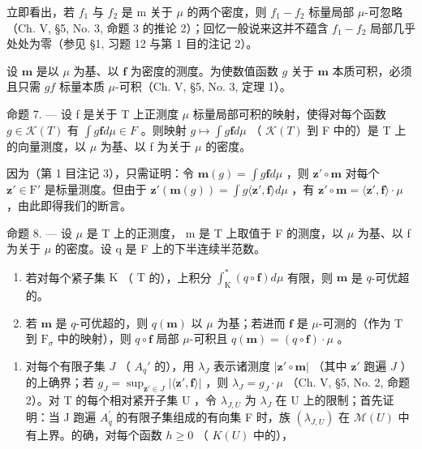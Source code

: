 立即看出，若 \(f_{1}\) 与 \(f_{2}\) 是 m 关于 \(\mu\) 的两个密度，则 \(f_{1}-f_{2}\) 标量局部 \(\mu\)-可忽略（Ch. V, §5, No. 3, 命题 3 的推论 2）；回忆一般说来这并不蕴含 \(f_{1}-f_{2}\) 局部几乎处处为零（参见 §1, 习题 12 与第 1 目的注记 2）。

设 \(\mathbf{m}\) 是以 \(\mu\) 为基、以 \(\mathbf{f}\) 为密度的测度。为使数值函数 \(g\) 关于 \(\mathbf{m}\) 本质可积，必须且只需 \(gf\) 标量本质 \(\mu\)-可积（Ch. V, §5, No. 3, 定理 1）。

命题 7. --- 设 f 是关于 T 上正测度 \(\mu\) 标量局部可积的映射，使得对每个函数 \(g \in \mathcal{K}(T)\) 有 \(\int g\mathbf{f} d\mu \in F\) 。则映射 \(g \mapsto \int g\mathbf{f} d\mu\) （ \(\mathcal{K}(T)\) 到 F 中的）是 T 上的向量测度，以 \(\mu\) 为基、以 f 为关于 \(\mu\) 的密度。

因为（第 1 目注记 3），只需证明：令 \(\mathbf{m}(g) = \int g\mathbf{f}d\mu\) ，则 \(\mathbf{z}' \circ \mathbf{m}\) 对每个 \(\mathbf{z}' \in \mathrm{F}'\) 是标量测度。但由于 \(\mathbf{z}'(\mathbf{m}(g)) = \int g\langle \mathbf{z}', \mathbf{f} \rangle d\mu\) ，有 \(\mathbf{z}' \circ \mathbf{m} = \langle \mathbf{z}', \mathbf{f} \rangle \cdot \mu\) ，由此即得我们的断言。

命题 8. --- 设 \(\mu\) 是 T 上的正测度， m 是 T 上取值于 F 的测度，以 \(\mu\) 为基、以 f 为关于 \(\mu\) 的密度。设 q 是 F 上的下半连续半范数。

\begin{enumerate}
\def\labelenumi{\alph{enumi})}
\item
  若对每个紧子集 \(\mathrm{K}\) （ \(\mathrm{T}\) 的），上积分 \(\int_{\mathrm{K}}^{*}(q \circ \mathbf{f}) d\mu\) 有限，则 \(\mathbf{m}\) 是 \(q\)-可优超的。
\item
  若 \(\mathbf{m}\) 是 \(q\)-可优超的，则 \(q(\mathbf{m})\) 以 \(\mu\) 为基；若进而 \(\mathbf{f}\) 是 \(\mu\)-可测的（作为 \(\mathrm{T}\) 到 \(\mathrm{F}_{\sigma}\) 中的映射），则 \(q \circ \mathbf{f}\) 局部 \(\mu\)-可积且 \(q(\mathbf{m}) = (q \circ \mathbf{f}) \cdot \mu\) 。
\end{enumerate}

\begin{enumerate}
\def\labelenumi{\alph{enumi})}
\tightlist
\item
  对每个有限子集 \(J\) （ \(A_q'\) 的），用 \(\lambda_J\) 表示诸测度 \(|\mathbf{z}' \circ \mathbf{m}|\) （其中 \(\mathbf{z}'\) 跑遍 \(J\) ）的上确界；若 \(g_J = \sup_{\mathbf{z}' \in J} |\langle \mathbf{z}', \mathbf{f} \rangle|\) ，则 \(\lambda_{J}=g_{J}\cdot\mu\) （Ch. V, §5, No. 2, 命题 2）。对 T 的每个相对紧开子集 U ，令 \(\lambda_{J,U}\) 为 \(\lambda_{J}\) 在 U 上的限制；首先证明：当 J 跑遍 \(A_{q}^{\prime}\) 的有限子集组成的有向集 F 时，族 \((\lambda_{J,U})\) 在 \(\mathcal{M}(U)\) 中有上界。的确，对每个函数 \(h\geqslant0\) （ \(K(U)\) 中的），
\end{enumerate}

